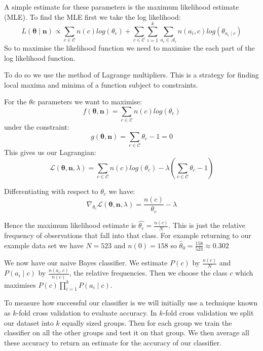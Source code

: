 A simple estimate for these parameters is the maximum likelihood estimate (MLE).
To find the MLE first we take the log likelihood:
\begin{equation}
	L(\mathbf{\theta} \mid \mathbf{n}) \propto \sum_{c \in \mathcal{C}}  n(c)log(\theta_c) + \sum_{c \in \mathcal{C}} \sum_{i=1}^k \sum_{a_i \in \mathcal{A}_i} n(a_i, c) log(\theta_{a_i \mid c}) 
\end{equation}
So to maximise the likelihood function we need to maximise the each part of the log likelihood function.

To do so we use the method of Lagrange multipliers.
This is a strategy for finding local maxima and minima of a function subject to constraints.

For the $\theta{c}$ parameters we want to maximise:
\begin{equation}
	f(\mathbf{\theta}, \mathbf{n}) = \sum_{c \in \mathcal{C}}  n(c)log(\theta_c)
\end{equation}
under the constraint:
\begin{equation}
	g(\mathbf{\theta}, \mathbf{n}) = \sum_{c \in \mathcal{C}}  \theta_c - 1 = 0
\end{equation}
This gives us our Lagrangian:
\begin{equation}
	\mathcal{L}(\mathbf{\theta}, \mathbf{n}, \lambda) = \sum_{c \in \mathcal{C}}  n(c)log(\theta_c) - \lambda(\sum_{c \in \mathcal{C}}  \theta_c - 1)
\end{equation}

Differentiating with respect to $\theta_c$ we have:
\begin{equation}
	\nabla_{\theta_c} \mathcal{L}(\mathbf{\theta}, \mathbf{n}, \lambda) = \frac{n(c)}{\theta_c} - \lambda
\end{equation}

Hence the maximum likelihood estimate is $\hat{\theta_c} = \frac{n(c)}{N}$.
This is just the relative frequency of observations that fall into that class.
For example returning to our example data set we have $N=523$ and $n(0)=158$ so $\hat\theta_0 = \frac{158}{523} \approx 0.302$


We now have our naive Bayes classifier.
We estimate $P(c)$ by $\frac{n(c)}{N}$ and $P(a_i \mid c)$ by $\frac{n(a_i, c)}{n(c)}$, the relative frequencies.
Then we choose the class $c$ which maximises $P(c)\prod_{i=1}^{k}P(a_i \mid c)$.

To measure how successful our classifier is we will initially use a technique known as $k$-fold cross validation to evaluate accuracy.
In $k$-fold cross validation we split our dataset into $k$ equally sized groups.
Then for each group we train the classifier on all the other groups and test it on that group.
We then average all these accuracy to return an estimate for the accuracy of our classifier.

